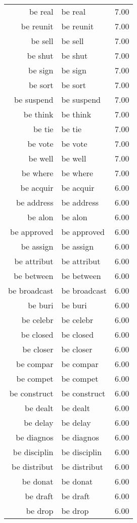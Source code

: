 \begin{table}[ht]
\begin{tabular}{rlr}
  be real & be real & 7.00 \\ 
  be reunit & be reunit & 7.00 \\ 
  be sell & be sell & 7.00 \\ 
  be shut & be shut & 7.00 \\ 
  be sign & be sign & 7.00 \\ 
  be sort & be sort & 7.00 \\ 
  be suspend & be suspend & 7.00 \\ 
  be think & be think & 7.00 \\ 
  be tie & be tie & 7.00 \\ 
  be vote & be vote & 7.00 \\ 
  be well & be well & 7.00 \\ 
  be where & be where & 7.00 \\ 
  be acquir & be acquir & 6.00 \\ 
  be address & be address & 6.00 \\ 
  be alon & be alon & 6.00 \\ 
  be approved & be approved & 6.00 \\ 
  be assign & be assign & 6.00 \\ 
  be attribut & be attribut & 6.00 \\ 
  be between & be between & 6.00 \\ 
  be broadcast & be broadcast & 6.00 \\ 
  be buri & be buri & 6.00 \\ 
  be celebr & be celebr & 6.00 \\ 
  be closed & be closed & 6.00 \\ 
  be closer & be closer & 6.00 \\ 
  be compar & be compar & 6.00 \\ 
  be compet & be compet & 6.00 \\ 
  be construct & be construct & 6.00 \\ 
  be dealt & be dealt & 6.00 \\ 
  be delay & be delay & 6.00 \\ 
  be diagnos & be diagnos & 6.00 \\ 
  be disciplin & be disciplin & 6.00 \\ 
  be distribut & be distribut & 6.00 \\ 
  be donat & be donat & 6.00 \\ 
  be draft & be draft & 6.00 \\ 
  be drop & be drop & 6.00 \\ 

\end{tabular}
\end{table}
